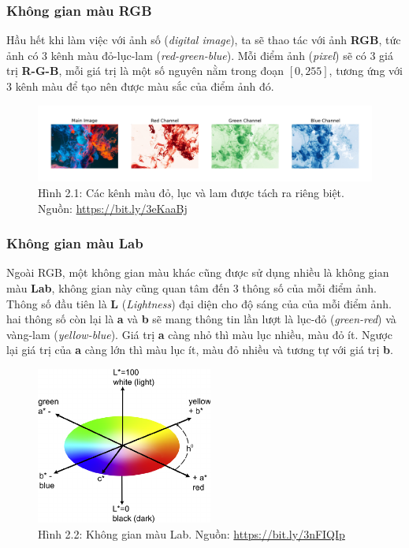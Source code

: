 \documentclass[a4paper]{article}
\begin{document}
\subsubsection{Không gian màu RGB}
Hầu hết khi làm việc với ảnh số (\textit{digital image}), ta sẽ thao tác với ảnh \textbf{RGB}, tức ảnh có 3 kênh màu đỏ-lục-lam (\textit{red-green-blue}). Mỗi điểm ảnh (\textit{pixel}) sẽ có 3 giá trị \textbf{R-G-B}, mỗi giá trị là một số nguyên nằm trong đoạn $[0, 255]$, tương ứng với 3 kênh màu để tạo nên được màu sắc của điểm ảnh đó.

\begin{figure}[h!]
\centering
\includegraphics[width=16.1cm]{images/2_1.jpeg}
\caption{Hình 2.1: Các kênh màu đỏ, lục và lam được tách ra riêng biệt. Nguồn: \href{https://bit.ly/3eKaaBj}{https://bit.ly/3eKaaBj}}
\end{figure}

\subsubsection{Không gian màu Lab}
Ngoài RGB, một không gian màu khác cũng được sử dụng nhiều là không gian màu \textbf{Lab}, không gian này cũng quan tâm đến 3 thông số của mỗi điểm ảnh. Thông số đầu tiên là \textbf{L} (\textit{Lightness}) đại diện cho độ sáng của của mỗi điểm ảnh. hai thông số còn lại là \textbf{a} và \textbf{b} sẽ mang thông tin lần lượt là lục-đỏ (\textit{green-red}) và vàng-lam (\textit{yellow-blue}). Giá trị \textbf{a} càng nhỏ thì màu lục nhiều, màu đỏ ít. Ngược lại giá trị của \textbf{a} càng lớn thì màu lục ít, màu đỏ nhiều và tương tự với giá trị \textbf{b}.

\begin{figure}[h!]
\centering
\includegraphics[width=5.8cm]{images/2_2.png}
\caption{Hình 2.2: Không gian màu Lab. Nguồn: \href{https://bit.ly/3nFIQIp}{https://bit.ly/3nFIQIp}}
\end{figure}
\end{document}
